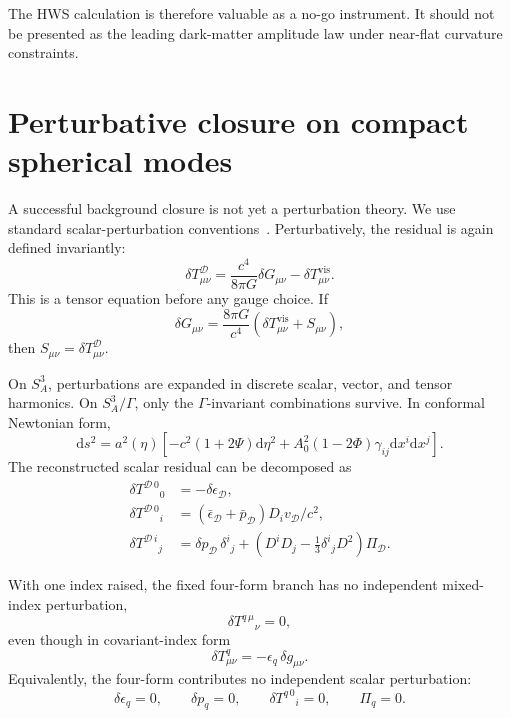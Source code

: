 \documentclass[
  aps,
  prd,
  reprint,
  superscriptaddress,
  floatfix,
  nofootinbib,
  longbibliography
]{revtex4-2}
\theoremstyle{plain}
\theoremstyle{definition}
\theoremstyle{remark}
\newcommand{\dd}{\mathrm d}
\newcommand{\D}{\mathcal D}
\newcommand{\vis}{\mathrm{vis}}
\newcommand{\eps}{\epsilon}
\begin{document}
The HWS calculation is therefore valuable as a no-go instrument.  It should not be presented as the leading dark-matter amplitude law under near-flat curvature constraints.

\section{Perturbative closure on compact spherical modes}

A successful background closure is not yet a perturbation theory.  We use standard scalar-perturbation conventions~\cite{Bardeen,KodamaSasaki,Mukhanov,MaBertschinger}.  Perturbatively, the residual is again defined invariantly:
\begin{equation}
\boxed{
\delta T^\D_{\mu\nu}
=
\frac{c^4}{8\pi G}\delta G_{\mu\nu}
-\delta T^{\vis}_{\mu\nu}.
}
\label{eq:linear_residual}
\end{equation}
This is a tensor equation before any gauge choice.  If
\begin{equation}
\delta G_{\mu\nu}
=
\frac{8\pi G}{c^4}
\left(\delta T^{\vis}_{\mu\nu}+S_{\mu\nu}\right),
\label{eq:linear_residual_assumption}
\end{equation}
then \(S_{\mu\nu}=\delta T^\D_{\mu\nu}\).

On \(S^3_A\), perturbations are expanded in discrete scalar, vector, and tensor harmonics.  On \(S^3_A/\Gamma\), only the \(\Gamma\)-invariant combinations survive.  In conformal Newtonian form,
\begin{equation}
\dd s^2=a^2(\eta)
\left[
-c^2(1+2\Psi)\dd\eta^2
+A_0^2(1-2\Phi)\gamma_{ij}\dd x^i\dd x^j
\right].
\label{eq:newtonian_metric}
\end{equation}
The reconstructed scalar residual can be decomposed as
\begin{align}
\delta T^{\D\,0}{}_{0}&=-\delta\eps_\D,\\
\delta T^{\D\,0}{}_{i}&=(\bar\eps_\D+\bar p_\D)D_i v_\D/c^2,\\
\delta T^{\D\,i}{}_{j}
&=\delta p_\D\,\delta^i{}_j
+\left(D^iD_j-\frac13\delta^i{}_jD^2\right)\Pi_\D .
\label{eq:scalar_decomp}
\end{align}

With one index raised, the fixed four-form branch has no independent
mixed-index perturbation,
\begin{equation}
\delta T^{q\,\mu}{}_{\nu}=0,
\label{eq:four_form_mixed_perturb}
\end{equation}
even though in covariant-index form
\begin{equation}
\delta T^q_{\mu\nu}=-\eps_q\,\delta g_{\mu\nu}.
\label{eq:four_form_covariant_perturb}
\end{equation}
Equivalently, the four-form contributes no independent scalar perturbation:
\begin{equation}
\delta\eps_q=0,\qquad
\delta p_q=0,\qquad
\delta T^{q\,0}{}_{i}=0,\qquad
\Pi_q=0.
\label{eq:four_form_null_perturb}
\end{equation}
\end{document}
